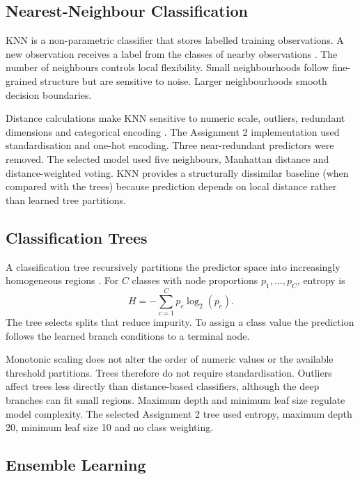 \documentclass[conference]{IEEEtran}
\begin{document}
\subsection{Nearest-Neighbour Classification}

KNN is a non-parametric classifier that stores labelled training observations. A new observation receives a label from the classes of nearby observations \cite{cover1967nearest}. The number of neighbours controls local flexibility. Small neighbourhoods follow fine-grained structure but are sensitive to noise. Larger neighbourhoods smooth decision boundaries.

Distance calculations make KNN sensitive to numeric scale, outliers, redundant dimensions and categorical encoding \cite{crone2006impact}. The Assignment 2 implementation used standardisation and one-hot encoding. Three near-redundant predictors were removed. The selected model used five neighbours, Manhattan distance and distance-weighted voting. KNN provides a structurally dissimilar baseline (when compared with the trees) because prediction depends on local distance rather than learned tree partitions.

\subsection{Classification Trees}

A classification tree recursively partitions the predictor space into increasingly homogeneous regions \cite{loh2011classification}. For $C$ classes with node proportions $p_1,\ldots,p_C$, entropy is
\begin{equation}
H=-\sum_{c=1}^{C}p_c\log_2(p_c).
\label{eq:entropy}
\end{equation}
The tree selects splits that reduce impurity. To assign a class value the prediction follows the learned branch conditions to a terminal node.

Monotonic scaling does not alter the order of numeric values or the available threshold partitions. Trees therefore do not require standardisation. Outliers affect trees less directly than distance-based classifiers, although the deep branches can fit small regions. Maximum depth and minimum leaf size regulate model complexity. The selected Assignment 2 tree used entropy, maximum depth 20, minimum leaf size 10 and no class weighting.

\subsection{Ensemble Learning}
\end{document}
